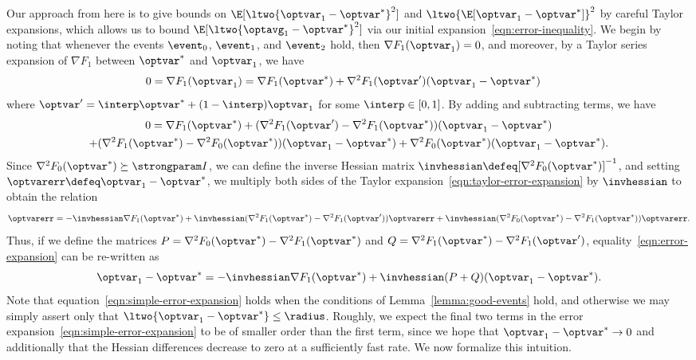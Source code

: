 \documentclass[11pt,twoside]{article}
\theoremstyle{definition}
\begin{document}
Our approach from here is to give bounds on $\E[\ltwo{\optvar_1 -
    \optvar^*}^2]$ and $\ltwo{\E[\optvar_1 - \optvar^*]}^2$ by careful
Taylor expansions, which allows us to bound $\E[\ltwo{\optavg_1 -
    \optvar^*}^2]$ via our initial
expansion~\eqref{eqn:error-inequality}.  We begin by noting that
whenever the events $\event_0$, $\event_1$, and $\event_2$ hold, then
$\nabla F_1(\optvar_1) = 0$, and moreover, by a Taylor series
expansion of $\nabla F_1$ between $\optvar^*$ and $\optvar_1$, we have
\begin{align*}
  0 = \nabla F_1(\optvar_1)
  & = \nabla F_1(\optvar^*) + \nabla^2 F_1(\optvar')(\optvar_1 - \optvar^*)
\end{align*}
where $\optvar' = \interp \optvar^* + (1 - \interp) \optvar_1$ for
some $\interp \in [0, 1]$.  By adding and subtracting terms,
we have
\begin{multline}
 \label{eqn:taylor-error-expansion}
0  = \nabla F_1(\optvar^*) + (\nabla^2 F_1(\optvar') - \nabla^2
F_1(\optvar^*)) (\optvar_1 - \optvar^*) \\
%
+ (\nabla^2 F_1(\optvar^*) -
\nabla^2 F_0(\optvar^*))(\optvar_1 - \optvar^*) + \nabla^2
F_0(\optvar^*)(\optvar_1 - \optvar^*).
\end{multline}
Since $\nabla^2 F_0(\optvar^*) \succeq \strongparam I$, we can define
the inverse Hessian matrix $\invhessian \defeq [\nabla^2
  F_0(\optvar^*)]^{-1}$, and setting $\optvarerr \defeq \optvar_1 -
\optvar^*$, we multiply both sides of the Taylor
expansion~\eqref{eqn:taylor-error-expansion} by $\invhessian$ to
obtain the relation
\begin{equation}
  \optvarerr = -\invhessian \nabla F_1(\optvar^*) +
  \invhessian(\nabla^2 F_1(\optvar^*) - \nabla^2 F_1(\optvar'))
  \optvarerr + \invhessian(\nabla^2 F_0(\optvar^*) - \nabla^2
  F_1(\optvar^*)) \optvarerr.
  \label{eqn:error-expansion}
\end{equation}
Thus, if we define the matrices $P = \nabla^2 F_0(\optvar^*) -
\nabla^2 F_1(\optvar^*)$ and
$Q = \nabla^2 F_1(\optvar^*) - \nabla^2
F_1(\optvar')$, equality~\eqref{eqn:error-expansion} can be re-written
as
\begin{equation}
  \label{eqn:simple-error-expansion}
  \optvar_1 - \optvar^* =
  -\invhessian \nabla F_1(\optvar^*)
  + \invhessian(P + Q)(\optvar_1 - \optvar^*).
\end{equation}
Note that equation~\eqref{eqn:simple-error-expansion} holds when the
conditions of Lemma~\ref{lemma:good-events} hold, and otherwise we may
simply assert only that $\ltwo{\optvar_1 - \optvar^*} \le \radius$.
Roughly, we expect the final two terms in the error
expansion~\eqref{eqn:simple-error-expansion} to be of smaller order
than the first term, since we hope that $\optvar_1 - \optvar^*
\rightarrow 0$ and additionally that the Hessian differences decrease
to zero at a sufficiently fast rate. We now formalize this intuition.
\end{document}
